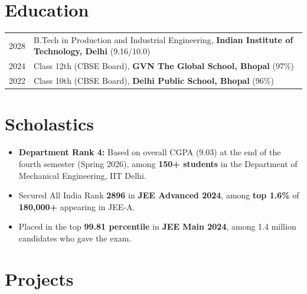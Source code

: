 \documentclass[a4paper,11pt]{article}
\begin{document}
\section{\textbf{Education}}
\begin{tabularx}{\linewidth}{@{}l X@{}}   
2028 & B.Tech in Production and Industrial Engineering, \textbf{Indian Institute of Technology, Delhi} \hfill \normalsize (9.16/10.0) \\
2024 & Class 12th (CBSE Board), \textbf{GVN The Global School, Bhopal} \hfill (97\%) \\ 
2022 & Class 10th (CBSE Board), \textbf{Delhi Public School, Bhopal} \hfill (96\%) \\ 
\end{tabularx}

\section{\textbf{Scholastics}}
\begin{minipage}[t]{\linewidth}
    \begin{itemize}[nosep,after=\strut, leftmargin=1em, itemsep=3pt,label=--]
    \item \textbf{Department Rank 4:} Based on overall CGPA (9.03) at the end of the fourth semester (Spring 2026), among \textbf{150+ students} in the Department of Mechanical Engineering, IIT Delhi. 
\item Secured All India Rank \textbf{2896} in \textbf{JEE Advanced 2024}, among \textbf{top 1.6\%} of \textbf{180,000+} appearing in JEE-A.
\item Placed in the top \textbf{99.81 percentile} in \textbf{JEE Main 2024}, among 1.4 million candidates who gave the exam.
    \end{itemize}
    \end{minipage}  

\section{\textbf{Projects}}
\end{document}
